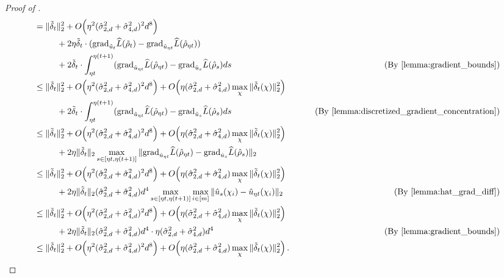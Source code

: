 \begin{proof}[Proof of ]
\begin{align}
& = \|\deltaSingleGD_t\|_2^2 + O\Big(\eta^2 (\sigmaCoeffTwo^2 + \sigmaCoeffFour^2)^2 d^8 \Big) \\
& \nextlinespace + 2 \eta \deltaSingleGD_t \cdot (\pgrad_{\uGD_t} \Lhat(\rhoGD_t) - \pgrad_{\uhat_{\eta t}} \Lhat(\rhohat_{\eta t})) \\
& \nextlinespace + 2 \deltaSingleGD_t \cdot \int_{\eta t}^{\eta (t + 1)} (\pgrad_{\uhat_{\eta t}} \Lhat(\rhohat_{\eta t}) - \pgrad_{\uhat_s} \Lhat(\rhohat_s) ds
& \tag{By \Cref{lemma:gradient_bounds}} \\
& \leq \|\deltaSingleGD_t\|_2^2 + O\Big(\eta^2 (\sigmaCoeffTwo^2 + \sigmaCoeffFour^2)^2 d^8 \Big) + O\Big(\eta (\sigmaCoeffTwo^2 + \sigmaCoeffFour^2) \max_\chi \|\deltaSingleGD_t(\chi)\|_2^2 \Big) \\
& \nextlinespace + 2 \deltaSingleGD_t \cdot \int_{\eta t}^{\eta (t + 1)} (\pgrad_{\uhat_{\eta t}} \Lhat(\rhohat_{\eta t}) - \pgrad_{\uhat_s} \Lhat(\rhohat_s) ds
& \tag{By \Cref{lemma:discretized_gradient_concentration}} \\
& \leq \|\deltaSingleGD_t\|_2^2 + O\Big(\eta^2 (\sigmaCoeffTwo^2 + \sigmaCoeffFour^2)^2 d^8 \Big) + O\Big(\eta (\sigmaCoeffTwo^2 + \sigmaCoeffFour^2) \max_\chi \|\deltaSingleGD_t(\chi)\|_2^2 \Big) \\
& \nextlinespace + 2 \eta \|\deltaSingleGD_t\|_2 \max_{s \in [\eta t, \eta (t + 1)]} \|\pgrad_{\uhat_{\eta t}} \Lhat(\rhohat_{\eta t}) - \pgrad_{\uhat_s} \Lhat(\rhohat_s) \|_2 \\
& \leq \|\deltaSingleGD_t\|_2^2 + O\Big(\eta^2 (\sigmaCoeffTwo^2 + \sigmaCoeffFour^2)^2 d^8 \Big) + O\Big(\eta (\sigmaCoeffTwo^2 + \sigmaCoeffFour^2) \max_\chi \|\deltaSingleGD_t(\chi)\|_2^2 \Big) \\
& \nextlinespace + 2 \eta \|\deltaSingleGD_t\|_2 (\sigmaCoeffTwo^2 + \sigmaCoeffFour^2) d^4  \max_{s \in [\eta t, \eta (t + 1)]} \max_{i \in [m]} \|\uhat_s(\chi_i) - \uhat_{\eta t}(\chi_i)\|_2 
& \tag{By \Cref{lemma:hat_grad_diff}} \\
& \leq \|\deltaSingleGD_t\|_2^2 + O\Big(\eta^2 (\sigmaCoeffTwo^2 + \sigmaCoeffFour^2)^2 d^8 \Big) + O\Big(\eta (\sigmaCoeffTwo^2 + \sigmaCoeffFour^2) \max_\chi \|\deltaSingleGD_t(\chi)\|_2^2 \Big) \\
& \nextlinespace + 2 \eta \|\deltaSingleGD_t\|_2 (\sigmaCoeffTwo^2 + \sigmaCoeffFour^2) d^4  \cdot \eta (\sigmaCoeffTwo^2 + \sigmaCoeffFour^2) d^4
& \tag{By \Cref{lemma:gradient_bounds}} \\
& \leq \|\deltaSingleGD_t\|_2^2 + O\Big(\eta^2 (\sigmaCoeffTwo^2 + \sigmaCoeffFour^2)^2 d^8 \Big) + O\Big(\eta (\sigmaCoeffTwo^2 + \sigmaCoeffFour^2) \max_\chi \|\deltaSingleGD_t(\chi)\|_2^2 \Big) \period

\end{align}
\end{proof}
